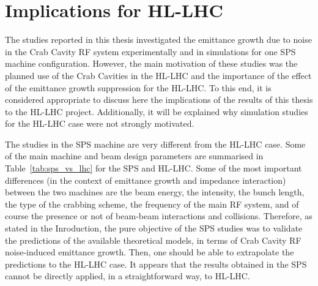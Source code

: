 \section{Implications for HL-LHC}
The studies reported in this thesis investigated the emittance growth due to noise in the Crab Cavity RF system experimentally and in simulations for one SPS machine configuration. However, the main motivation of these studies was the planned use of the Crab Cavities in the HL-LHC and the importance of the effect of the emittance growth suppression for the HL-LHC. To this end, it is considered appropriate to discuss here the implications of the results of this thesis to the HL-LHC project. Additionally, it will be explained why simulation studies for the HL-LHC case were not strongly motivated.

The studies in the SPS machine are very different from the HL-LHC case. Some of the main machine and beam design parameters are summarised in Table~\ref{tab:sps_vs_lhc} for the SPS and HL-LHC. Some of the most important differences (in the context of emittance growth and impedance interaction) between the two machines are the beam energy, the intensity, the bunch length, the type of the crabbing scheme, the frequency of the main RF system, and of course the presence or not of beam-beam interactions and collisions. Therefore, as stated in the Inroduction, the pure objective of the SPS studies was to validate the predictions of the available theoretical models, in terms of Crab Cavity RF noise-induced emittance growth. Then, one should be able to extrapolate the predictions to the HL-LHC case. It appears that the results obtained in the SPS cannot be directly applied, in a straightforward way, to HL-LHC.

